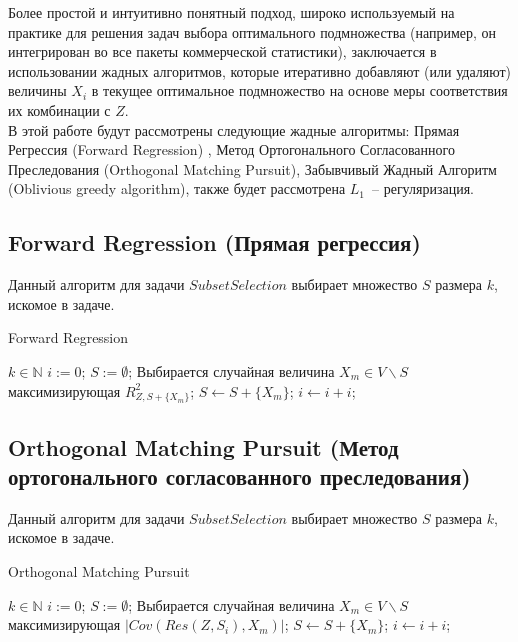 \documentclass[preprint,12pt]{elsarticle}
\begin{document}
Более простой и интуитивно понятный подход, широко используемый на практике для решения задач выбора оптимального подмножества (например, он интегрирован во все пакеты коммерческой статистики), заключается в использовании жадных алгоритмов, которые итеративно добавляют (или удаляют) величины $X_i$ в текущее оптимальное подмножество на основе меры соответствия их комбинации с $Z$.\\

В этой работе будут рассмотрены следующие жадные алгоритмы: Прямая Регрессия (Forward Regression) \cite{miller2002subset}, Метод Ортогонального Согласованного Преследования (Orthogonal Matching Pursuit)\cite{tropp2004greed}, Забывчивый Жадный Алгоритм (Oblivious greedy algorithm), также будет рассмотрена $L_1$~-- регуляризация.

\subsection{Forward Regression (Прямая регрессия)}
Данный алгоритм для задачи $Subset Selection$ выбирает множество $S$ размера $k$, искомое в задаче. 

\begin{algorithm}%
\caption{Forward Regression}\label{algo::fg1}
\begin{algorithmic}[1]
\Require $k \in \mathbb{N}$
\State $i := 0$;
\State $S := \emptyset$;
\State Выбирается случайная величина $X_m \in V \backslash S$ максимизирующая $R_{Z, S + \{X_m\}}^{2}$;
\State $S \gets S + \{X_m\}$;
\State $i \gets i + i$;
\EndWhile
\end{algorithmic}
\end{algorithm}

\subsection{Orthogonal Matching Pursuit (Метод ортогонального согласованного преследования)}
Данный алгоритм для задачи $Subset Selection$ выбирает множество $S$ размера $k$, искомое в задаче. 

\begin{algorithm}%
\caption{Orthogonal Matching Pursuit}\label{algo::fg2}
\begin{algorithmic}[1]
\Require $k \in \mathbb{N}$
\State $i := 0$;
\State $S := \emptyset$;
\State Выбирается случайная величина $X_m \in V \backslash S$ максимизирующая $|Cov(Res(Z, S_i), X_m)|$;
\State $S \gets S + \{X_m\}$;
\State $i \gets i + i$;
\EndWhile
\end{algorithmic}
\end{algorithm}
\end{document}
